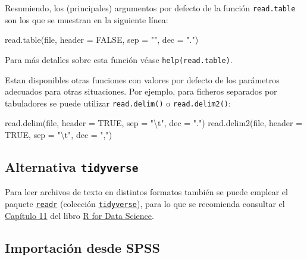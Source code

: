 \documentclass[
]{book}
\newenvironment{Shaded}{\begin{snugshade}}{\end{snugshade}}
\newcommand{\AttributeTok}[1]{\textcolor[rgb]{0.77,0.63,0.00}{#1}}
\newcommand{\ConstantTok}[1]{\textcolor[rgb]{0.00,0.00,0.00}{#1}}
\newcommand{\FunctionTok}[1]{\textcolor[rgb]{0.00,0.00,0.00}{#1}}
\newcommand{\NormalTok}[1]{#1}
\newcommand{\SpecialCharTok}[1]{\textcolor[rgb]{0.00,0.00,0.00}{#1}}
\newcommand{\StringTok}[1]{\textcolor[rgb]{0.31,0.60,0.02}{#1}}
\theoremstyle{break}
\theoremstyle{nonumberplain}
\begin{document}
Resumiendo, los (principales) argumentos por defecto de la función
\texttt{read.table} son los que se muestran en la siguiente línea:

\begin{Shaded}
\begin{Highlighting}[]
\FunctionTok{read.table}\NormalTok{(file, }\AttributeTok{header =} \ConstantTok{FALSE}\NormalTok{, }\AttributeTok{sep =} \StringTok{""}\NormalTok{, }\AttributeTok{dec =} \StringTok{"."}\NormalTok{)  }
\end{Highlighting}
\end{Shaded}

Para más detalles sobre esta función véase
\texttt{help(read.table)}.

Estan disponibles otras funciones con valores por defecto de los parámetros
adecuados para otras situaciones. Por ejemplo, para ficheros separados por tabuladores
se puede utilizar \texttt{read.delim()} o \texttt{read.delim2()}:

\begin{Shaded}
\begin{Highlighting}[]
\FunctionTok{read.delim}\NormalTok{(file, }\AttributeTok{header =} \ConstantTok{TRUE}\NormalTok{, }\AttributeTok{sep =} \StringTok{"}\SpecialCharTok{\textbackslash{}t}\StringTok{"}\NormalTok{, }\AttributeTok{dec =} \StringTok{"."}\NormalTok{)}
\FunctionTok{read.delim2}\NormalTok{(file, }\AttributeTok{header =} \ConstantTok{TRUE}\NormalTok{, }\AttributeTok{sep =} \StringTok{"}\SpecialCharTok{\textbackslash{}t}\StringTok{"}\NormalTok{, }\AttributeTok{dec =} \StringTok{","}\NormalTok{)}
\end{Highlighting}
\end{Shaded}

\hypertarget{alternativa-tidyverse}{%
\subsection{\texorpdfstring{Alternativa \texttt{tidyverse}}{Alternativa tidyverse}}\label{alternativa-tidyverse}}

Para leer archivos de texto en distintos formatos también se puede emplear el paquete \href{https://readr.tidyverse.org}{\texttt{readr}}
(colección \href{https://www.tidyverse.org/}{\texttt{tidyverse}}), para lo que se recomienda
consultar el \href{https://r4ds.had.co.nz/data-import.html}{Capítulo 11} del libro \href{http://r4ds.had.co.nz}{R for Data Science}.

\hypertarget{importaciuxf3n-desde-spss}{%
\subsection{Importación desde SPSS}\label{importaciuxf3n-desde-spss}}
\end{document}
